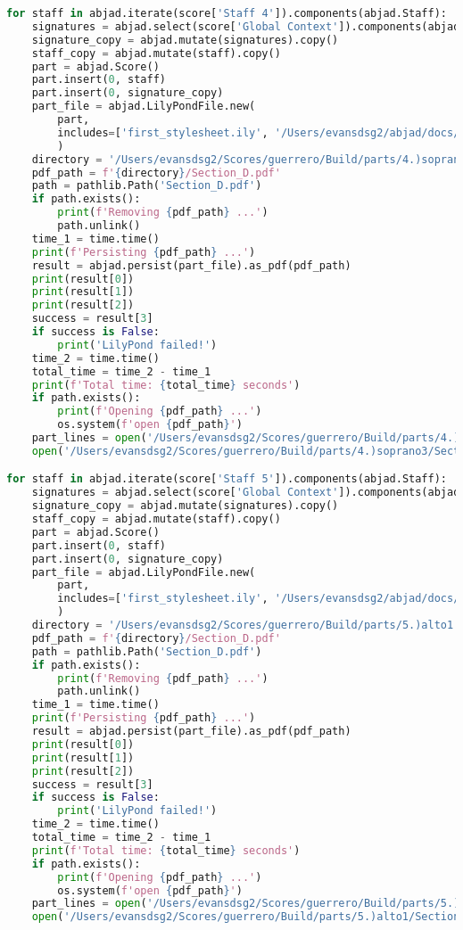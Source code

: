 \begin{lstlisting}[language=Python, caption=Invocation Source Code]
for staff in abjad.iterate(score['Staff 4']).components(abjad.Staff):
    signatures = abjad.select(score['Global Context']).components(abjad.Staff)
    signature_copy = abjad.mutate(signatures).copy()
    staff_copy = abjad.mutate(staff).copy()
    part = abjad.Score()
    part.insert(0, staff)
    part.insert(0, signature_copy)
    part_file = abjad.LilyPondFile.new(
        part,
        includes=['first_stylesheet.ily', '/Users/evansdsg2/abjad/docs/source/_stylesheets/abjad.ily'],
        )
    directory = '/Users/evansdsg2/Scores/guerrero/Build/parts/4.)soprano3'
    pdf_path = f'{directory}/Section_D.pdf'
    path = pathlib.Path('Section_D.pdf')
    if path.exists():
        print(f'Removing {pdf_path} ...')
        path.unlink()
    time_1 = time.time()
    print(f'Persisting {pdf_path} ...')
    result = abjad.persist(part_file).as_pdf(pdf_path)
    print(result[0])
    print(result[1])
    print(result[2])
    success = result[3]
    if success is False:
        print('LilyPond failed!')
    time_2 = time.time()
    total_time = time_2 - time_1
    print(f'Total time: {total_time} seconds')
    if path.exists():
        print(f'Opening {pdf_path} ...')
        os.system(f'open {pdf_path}')
    part_lines = open('/Users/evansdsg2/Scores/guerrero/Build/parts/4.)soprano3/Section_D.ly').readlines()
    open('/Users/evansdsg2/Scores/guerrero/Build/parts/4.)soprano3/Section_D.ly', 'w').writelines(part_lines[15:-1])

for staff in abjad.iterate(score['Staff 5']).components(abjad.Staff):
    signatures = abjad.select(score['Global Context']).components(abjad.Staff)
    signature_copy = abjad.mutate(signatures).copy()
    staff_copy = abjad.mutate(staff).copy()
    part = abjad.Score()
    part.insert(0, staff)
    part.insert(0, signature_copy)
    part_file = abjad.LilyPondFile.new(
        part,
        includes=['first_stylesheet.ily', '/Users/evansdsg2/abjad/docs/source/_stylesheets/abjad.ily'],
        )
    directory = '/Users/evansdsg2/Scores/guerrero/Build/parts/5.)alto1'
    pdf_path = f'{directory}/Section_D.pdf'
    path = pathlib.Path('Section_D.pdf')
    if path.exists():
        print(f'Removing {pdf_path} ...')
        path.unlink()
    time_1 = time.time()
    print(f'Persisting {pdf_path} ...')
    result = abjad.persist(part_file).as_pdf(pdf_path)
    print(result[0])
    print(result[1])
    print(result[2])
    success = result[3]
    if success is False:
        print('LilyPond failed!')
    time_2 = time.time()
    total_time = time_2 - time_1
    print(f'Total time: {total_time} seconds')
    if path.exists():
        print(f'Opening {pdf_path} ...')
        os.system(f'open {pdf_path}')
    part_lines = open('/Users/evansdsg2/Scores/guerrero/Build/parts/5.)alto1/Section_D.ly').readlines()
    open('/Users/evansdsg2/Scores/guerrero/Build/parts/5.)alto1/Section_D.ly', 'w').writelines(part_lines[15:-1])


\end{lstlisting}
